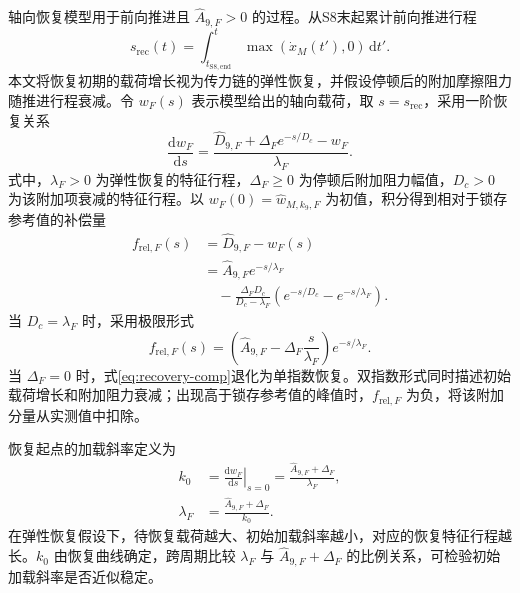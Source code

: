 \documentclass{JQRnew}
\providecommand{\RevisionColor}{\color{black}}
\newcommand{\revbegin}{\begingroup\RevisionColor}
\newcommand{\revend}{\par\endgroup}
\begin{document}
\revbegin
轴向恢复模型用于前向推进且 $\widehat A_{9,F}>0$ 的过程。从S8末起累计前向推进行程
\begin{equation}
\label{eq:recovery-travel}
s_{\mathrm{rec}}(t)=\int_{t_{\mathrm{S8,end}}}^{t}
\max\!\left(\dot x_M(t'),0\right)\,\mathrm dt'.
\end{equation}
本文将恢复初期的载荷增长视为传力链的弹性恢复，并假设停顿后的附加摩擦阻力随推进行程衰减。令 $w_F(s)$ 表示模型给出的轴向载荷，取 $s=s_{\mathrm{rec}}$，采用一阶恢复关系
\begin{equation}
\label{eq:recovery-ode}
\frac{\mathrm dw_F}{\mathrm ds}
=\frac{\widehat D_{9,F}+\Delta_F e^{-s/D_c}-w_F}{\lambda_F}.
\end{equation}
式中，$\lambda_F>0$ 为弹性恢复的特征行程，$\Delta_F\ge0$ 为停顿后附加阻力幅值，$D_c>0$ 为该附加项衰减的特征行程。以 $w_F(0)=\widehat w_{M,k_9,F}$ 为初值，积分得到相对于锁存参考值的补偿量
\begin{equation}
\label{eq:recovery-comp}
\begin{aligned}
f_{\mathrm{rel},F}(s)&=\widehat D_{9,F}-w_F(s)\\
&=\widehat A_{9,F}e^{-s/\lambda_F}\\
&\quad-\frac{\Delta_FD_c}{D_c-\lambda_F}
\left(e^{-s/D_c}-e^{-s/\lambda_F}\right).
\end{aligned}
\end{equation}
当 $D_c=\lambda_F$ 时，采用极限形式
\begin{equation}
\label{eq:equal-scales}
f_{\mathrm{rel},F}(s)=
\left(\widehat A_{9,F}-\Delta_F\frac{s}{\lambda_F}\right)e^{-s/\lambda_F}.
\end{equation}
当 $\Delta_F=0$ 时，式\eqref{eq:recovery-comp}退化为单指数恢复。双指数形式同时描述初始载荷增长和附加阻力衰减；出现高于锁存参考值的峰值时，$f_{\mathrm{rel},F}$ 为负，将该附加分量从实测值中扣除。
\revend

\revbegin
恢复起点的加载斜率定义为
\begin{equation}
\label{eq:initial-slope}
\begin{aligned}
k_0&=\left.\frac{\mathrm dw_F}{\mathrm ds}\right|_{s=0}
=\frac{\widehat A_{9,F}+\Delta_F}{\lambda_F},\\
\lambda_F&=\frac{\widehat A_{9,F}+\Delta_F}{k_0}.
\end{aligned}
\end{equation}
在弹性恢复假设下，待恢复载荷越大、初始加载斜率越小，对应的恢复特征行程越长。$k_0$ 由恢复曲线确定，跨周期比较 $\lambda_F$ 与 $\widehat A_{9,F}+\Delta_F$ 的比例关系，可检验初始加载斜率是否近似稳定。
\revend
\end{document}
